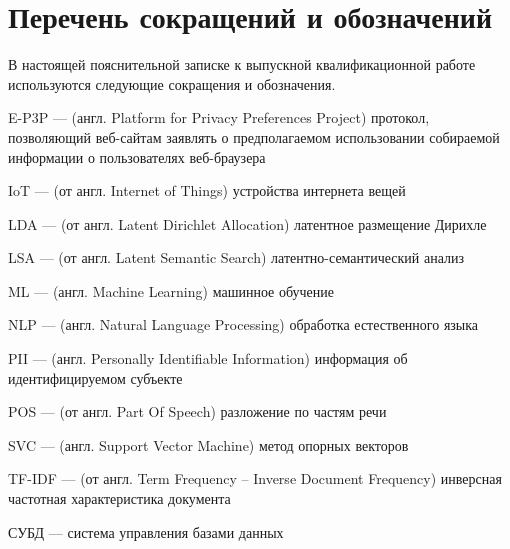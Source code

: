\documentclass[../main]{subfiles}
\begin{document}
\newpage
{}
{}
\section*{Перечень сокращений и обозначений}

В настоящей пояснительной записке к выпускной квалификационной
работе используются следующие сокращения и обозначения.

\begin{termenum}
    \item E-P3P --- (англ. Platform for Privacy Preferences Project) протокол, позволяющий веб-сайтам заявлять о предполагаемом использовании собираемой информации о пользователях веб-браузера
    \item IoT --- (от англ. Internet of Things) устройства интернета вещей
    \item LDA --- (от англ. Latent Dirichlet Allocation) латентное размещение Дирихле
    \item LSA --- (от англ. Latent Semantic Search) латентно-семантический анализ
    \item ML --- (англ. Machine Learning) машинное обучение
    \item NLP --- (англ. Natural Language Processing) обработка естественного языка
    \item PII --- (англ. Personally Identifiable Information) информация об идентифицируемом субъекте
    \item POS --- (от англ. Part Of Speech) разложение по частям речи
    \item SVC --- (англ. Support Vector Machine) метод опорных векторов
    \item TF-IDF --- (от англ. Term Frequency -- Inverse Document Frequency) инверсная частотная характеристика документа
    \item СУБД --- система управления базами данных
\end{termenum}
\end{document}

